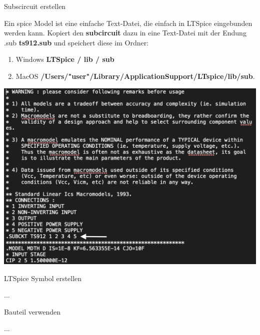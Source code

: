 \begin{frame}[t]{Subscircuit erstellen} 

    Ein spice Model ist eine einfache Text-Datei, die einfach in LTSpice eingebunden werden kann.
    Kopiert den \textbf{subcircuit} dazu in eine Text-Datei mit der Endung .sub \textbf{ts912.sub} und speichert diese im Ordner:

    \begin{scriptsize}
        \begin{enumerate}
            \item Windows \textbf{LTSpice / lib / sub} 
            \item MacOS \textbf{/Users/"user"/Library/ApplicationSupport/LTspice/lib/sub}.
        \end{enumerate}
    \end{scriptsize}

    \begin{spacing}{0.9} \begin{tiny}
        \begin{minipage}{\textwidth}
          \includegraphics[width=0.5\linewidth]{pictures/spice_model.png}
        \end{minipage}
    \end{tiny} \end{spacing}
\end{frame}

\begin{frame}[t]{LTSpice Symbol erstellen} 

    ...
\end{frame}

\begin{frame}[t]{Bauteil verwenden} 

    ...
\end{frame}